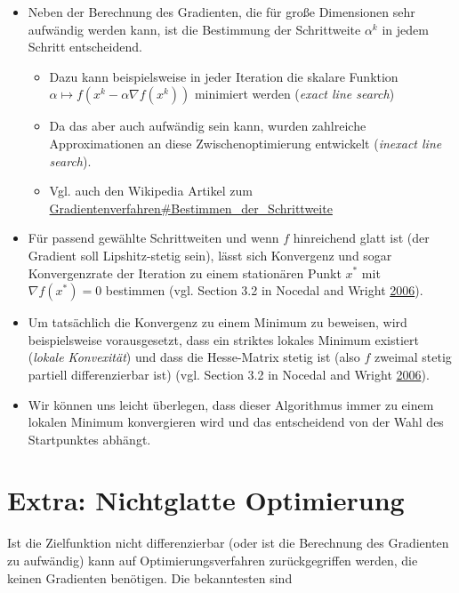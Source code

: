 \documentclass[]{book}
\providecommand{\tightlist}{%
  \setlength{\itemsep}{0pt}\setlength{\parskip}{0pt}}
\theoremstyle{definition}
\theoremstyle{definition}
\theoremstyle{definition}
\theoremstyle{definition}
\theoremstyle{remark}
\begin{document}
\begin{itemize}
\item
  Neben der Berechnung des Gradienten, die für große Dimensionen sehr aufwändig werden kann, ist die Bestimmung der Schrittweite \(\alpha^k\) in jedem Schritt entscheidend.

  \begin{itemize}
  \tightlist
  \item
    Dazu kann beispielsweise in jeder Iteration die skalare Funktion \(\alpha \mapsto f(x^{k} - \alpha \nabla f(x^k))\) minimiert werden (\emph{exact line search})
  \item
    Da das aber auch aufwändig sein kann, wurden zahlreiche Approximationen an diese Zwischenoptimierung entwickelt (\emph{inexact line search}).
  \item
    Vgl. auch den Wikipedia Artikel zum \href{https://de.wikipedia.org/wiki/Gradientenverfahren\#Bestimmen_der_Schrittweite}{Gradientenverfahren\#Bestimmen\_der\_Schrittweite}
  \end{itemize}
\item
  Für passend gewählte Schrittweiten und wenn \(f\) hinreichend glatt ist (der Gradient soll Lipshitz-stetig sein), lässt sich Konvergenz und sogar Konvergenzrate der Iteration zu einem stationären Punkt \(x^*\) mit \(\nabla f(x^*)=0\) bestimmen (vgl. Section 3.2 in Nocedal and Wright \protect\hyperlink{ref-NocW06}{2006}).
\item
  Um tatsächlich die Konvergenz zu einem Minimum zu beweisen, wird beispielsweise vorausgesetzt, dass ein striktes lokales Minimum existiert (\emph{lokale Konvexität}) und dass die Hesse-Matrix stetig ist (also \(f\) zweimal stetig partiell differenzierbar ist) (vgl. Section 3.2 in Nocedal and Wright \protect\hyperlink{ref-NocW06}{2006}).
\item
  Wir können uns leicht überlegen, dass dieser Algorithmus immer zu einem lokalen Minimum konvergieren wird und das entscheidend von der Wahl des Startpunktes abhängt.
\end{itemize}

\hypertarget{extra-nichtglatte-optimierung}{%
\section{Extra: Nichtglatte Optimierung}\label{extra-nichtglatte-optimierung}}

Ist die Zielfunktion nicht differenzierbar (oder ist die Berechnung des Gradienten zu aufwändig) kann auf Optimierungsverfahren zurückgegriffen werden, die keinen Gradienten benötigen. Die bekanntesten sind
\end{document}
